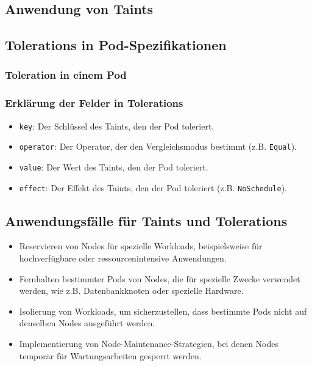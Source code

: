 \subsection{Anwendung von Taints}


\newpage

\subsection{Tolerations in Pod-Spezifikationen}

\subsubsection{Toleration in einem Pod}


\subsubsection{Erklärung der Felder in Tolerations}
\begin{itemize}
    \item \texttt{key}: Der Schlüssel des Taints, den der Pod toleriert.
    \item \texttt{operator}: Der Operator, der den Vergleichsmodus bestimmt (z.B. \texttt{Equal}).
    \item \texttt{value}: Der Wert des Taints, den der Pod toleriert.
    \item \texttt{effect}: Der Effekt des Taints, den der Pod toleriert (z.B. \texttt{NoSchedule}).
\end{itemize}

\subsection{Anwendungsfälle für Taints und Tolerations}
\begin{itemize}
    \item Reservieren von Nodes für spezielle Workloads, beispielsweise für hochverfügbare oder ressourcenintensive Anwendungen.
    \item Fernhalten bestimmter Pods von Nodes, die für spezielle Zwecke verwendet werden, wie z.B. Datenbankknoten oder spezielle Hardware.
    \item Isolierung von Workloads, um sicherzustellen, dass bestimmte Pods nicht auf denselben Nodes ausgeführt werden.
    \item Implementierung von Node-Maintenance-Strategien, bei denen Nodes temporär für Wartungsarbeiten gesperrt werden.
\end{itemize}

